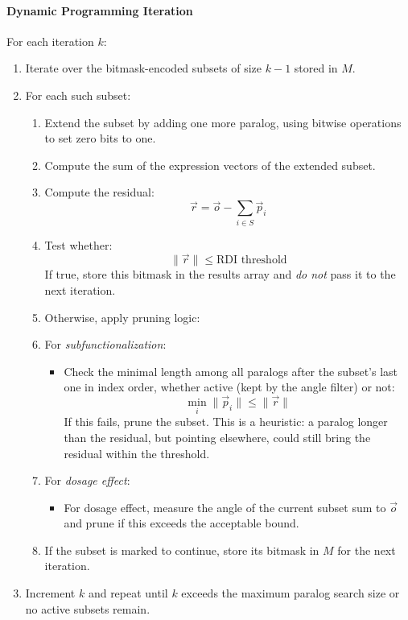         \paragraph{Dynamic Programming Iteration}
        For each iteration $k$:
        \begin{enumerate}
            \item Iterate over the bitmask-encoded subsets of size $k-1$ stored in $M$.
            \item For each such subset:
                \begin{enumerate}
                    \item Extend the subset by adding one more paralog, using bitwise operations to set zero bits to one.
                    \item Compute the sum of the expression vectors of the extended subset.
                    \item Compute the residual:
                        \[
                        \vec{r} = \vec{o} - \sum_{i \in S} \vec{p}_i
                        \]
                    \item Test whether:
                        \[
                        \|\vec{r}\| \leq \text{RDI threshold}
                        \]
                    If true, store this bitmask in the results array and \emph{do not} pass it to the next iteration.
                    \item Otherwise, apply pruning logic:
                    \item For \emph{subfunctionalization}:
                          \begin{itemize}
                              \item Check the minimal length among all paralogs after the subset's last one in index order, whether active (kept by the angle filter) or not:
                                    \[
                                    \min_{i} \|\vec{p}_i\| \leq \|\vec{r}\|
                                    \]
                                    If this fails, prune the subset. This is a heuristic: a paralog longer than the residual, but pointing elsewhere, could still bring the residual within the threshold.
                          \end{itemize}
                    \item For \emph{dosage effect}:
                          \begin{itemize}
                              \item For dosage effect, measure the angle of the current subset sum to $\vec{o}$ and prune if this exceeds the acceptable bound.
                          \end{itemize}
                    \item If the subset is marked to continue, store its bitmask in $M$ for the next iteration.
                \end{enumerate}
            \item Increment $k$ and repeat until $k$ exceeds the maximum paralog search size or no active subsets remain.
        \end{enumerate}

